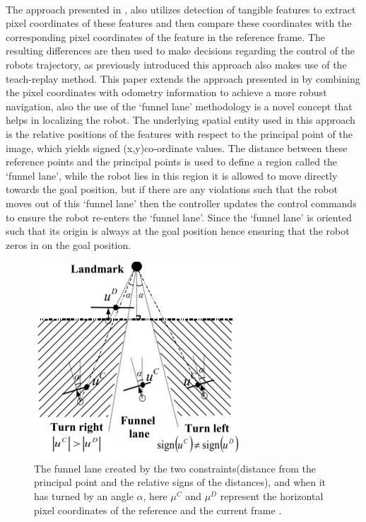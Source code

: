 	\paragraph{}The approach presented in \cite{chen2009qualitative}, also utilizes detection of tangible features to extract pixel coordinates of these features and then compare these coordinates with the corresponding pixel coordinates of the feature in the reference frame. The resulting differences are then used to make decisions regarding the control of the robots trajectory, as previously introduced this approach also makes use of the teach-replay method. This paper extends the approach presented in \cite{chen2006qualitative} by combining the pixel coordinates with odometry information to achieve a more robust navigation, also the use of the `funnel lane' methodology is a novel concept that helps in localizing the robot. The underlying spatial entity used in this approach is the relative positions of the features with respect to the principal point of the image, which yields signed (x,y)co-ordinate values. The distance between these reference points and the principal points is used to define a region called the `funnel lane', while the robot lies in this region it is allowed to move directly towards the goal position, but if there are any violations such that the robot moves out of this `funnel lane' then the controller updates the control commands to ensure the robot re-enters the `funnel lane'. Since the `funnel lane' is oriented such that its origin is always at the goal position hence ensuring that the robot zeros in on the goal position.
	\begin{figure}[h]
		\centering
		\includegraphics[scale=1]{images/funnel_lane}
		\caption{The funnel lane created by the two constraints(distance from the principal point and the relative signs of the distances), and when it has turned by an angle $\alpha$, here $\mu^C$  and  $\mu^D$ represent the horizontal pixel coordinates of the reference and the current frame \cite{chen2006qualitative}.}
		\label{fig:funnellane}
	\end{figure}
	
